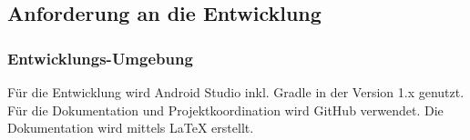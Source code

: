 \subsection{\textbf{Anforderung an die Entwicklung}}

\subsubsection{Entwicklungs-Umgebung}
Für die Entwicklung wird Android Studio inkl. Gradle in der Version 1.x genutzt. Für die Dokumentation und Projektkoordination wird GitHub verwendet.
Die Dokumentation wird mittels \LaTeX{} erstellt.



%
%
%
%
%



